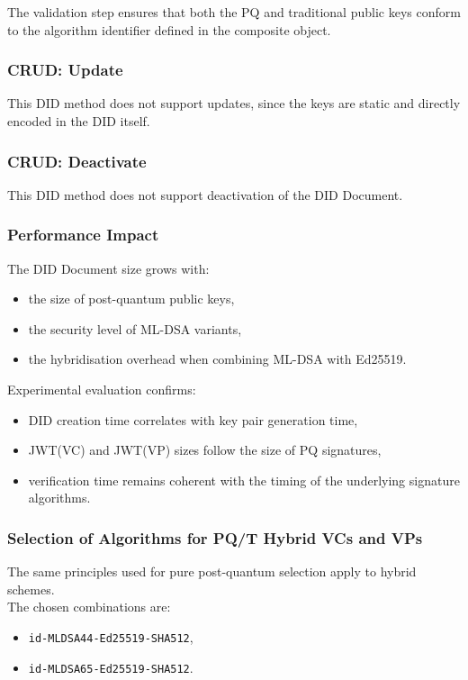 \noindent
The validation step ensures that both the PQ and traditional public keys conform to the algorithm identifier defined in the composite object.

\subsubsection*{CRUD: Update}

This DID method does not support updates, since the keys are static and directly encoded in the DID itself.

\subsubsection*{CRUD: Deactivate}

This DID method does not support deactivation of the DID Document.


\subsubsection*{Performance Impact}

The DID Document size grows with:
\begin{itemize}
    \item the size of post-quantum public keys,
    \item the security level of ML-DSA variants,
    \item the hybridisation overhead when combining ML-DSA with Ed25519.
\end{itemize}

\noindent
Experimental evaluation confirms:
\begin{itemize}
    \item DID creation time correlates with key pair generation time,
    \item JWT(VC) and JWT(VP) sizes follow the size of PQ signatures,
    \item verification time remains coherent with the timing of the underlying signature algorithms.
\end{itemize}

\subsubsection*{Selection of Algorithms for PQ/T Hybrid VCs and VPs}

The same principles used for pure post-quantum selection apply to hybrid schemes.\\
The chosen combinations are:
\begin{itemize}
    \item \texttt{id-MLDSA44-Ed25519-SHA512},
    \item \texttt{id-MLDSA65-Ed25519-SHA512}.
\end{itemize}


